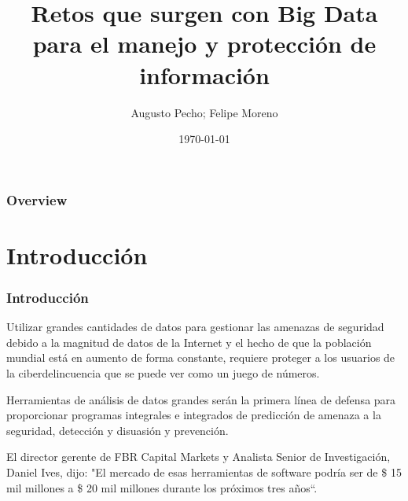 \documentclass{beamer}
\title[Artículo Big Data]{Retos que surgen con Big Data para el manejo y protección de información} %
\author{Augusto Pecho; Felipe Moreno} %
\institute[UNI] %
{
Universidad Nacional de Ingeniería \\ %
\medskip
\textit{} %
}
\date{\today} %
\begin{document}
\begin{frame}
\titlepage %
\end{frame}

\begin{frame}
\frametitle{Overview} %
\tableofcontents %
\end{frame}


\section{Introducción} %

\begin{frame}
\frametitle{Introducción}
\begin{block}{}
Utilizar grandes cantidades de datos para gestionar las amenazas de seguridad debido a la magnitud de datos de la Internet y el hecho de que la población mundial está en aumento de forma constante, requiere proteger a los usuarios de la ciberdelincuencia que se puede ver como un juego de números. 
\end{block}

\begin{block}{}
Herramientas de análisis de datos grandes serán la primera línea de defensa para proporcionar programas integrales e integrados de predicción de amenaza a la seguridad, detección y disuasión y prevención. 
\end{block}

\begin{block}{}
El director gerente de FBR Capital Markets y Analista Senior de Investigación, Daniel Ives, dijo: "El mercado de esas herramientas de software podría ser de \$ 15 mil millones a \$ 20 mil millones durante los próximos tres años“.
\end{block}
\end{frame}
\end{document}
